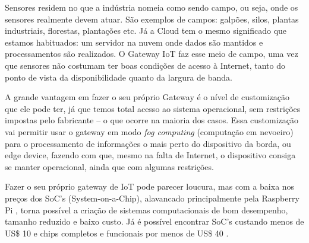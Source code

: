 Sensores residem no que a indústria nomeia como sendo campo, ou seja, onde os sensores realmente devem atuar. São exemplos de campos: galpões, silos, plantas industriais, florestas, plantações etc. Já a Cloud tem o mesmo significado que estamos habituados: um servidor na nuvem onde dados são mantidos e processamentos são realizados. O Gateway IoT faz esse meio de campo, uma vez que sensores não costumam ter boas condições de acesso à Internet, tanto do ponto de vista da disponibilidade quanto da largura de banda.

A grande vantagem em fazer o seu próprio Gateway é o nível de customização que ele pode ter, já que temos total acesso ao sistema operacional, sem restrições impostas pelo fabricante – o que ocorre na maioria dos casos. Essa customização vai permitir usar o gateway em modo \textit{fog computing} (computação em nevoeiro) para o processamento de informações o mais perto do dispositivo da borda, ou edge device, fazendo com que, mesmo na falta de Internet, o dispositivo consiga se manter operacional, ainda que com algumas restrições.

Fazer o seu próprio gateway de IoT pode parecer loucura, mas com a baixa nos preços dos SoC’s (System-on-a-Chip), alavancado principalmente pela Raspberry Pi \cite{RaspberryPi}, torna possível a criação de sistemas computacionais de bom desempenho, tamanho reduzido e baixo custo. Já é possível encontrar SoC’s custando menos de US\$ 10 e chips completos e funcionais por menos de US\$ 40 \cite{RaspberryPiVenda}.